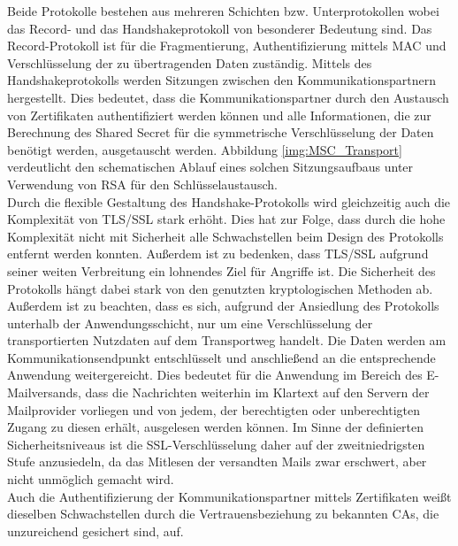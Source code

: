 \documentclass  [paper=a4,
				fontsize=12pt,
				listof=totoc,
				bibliography=totoc
				]{scrreprt}
\begin{document}
			Beide Protokolle bestehen aus mehreren Schichten bzw. Unterprotokollen wobei das Record- und das Handshakeprotokoll von besonderer Bedeutung sind. 
			Das Record-Protokoll ist für die Fragmentierung, Authentifizierung mittels \ac{MAC} und Verschlüsselung der zu übertragenden Daten zuständig. 
			Mittels des Handshakeprotokolls werden Sitzungen zwischen den Kommunikationspartnern hergestellt. 
			Dies bedeutet, dass die Kommunikationspartner durch den Austausch von Zertifikaten authentifiziert werden können und alle Informationen, die zur Berechnung des Shared Secret für die symmetrische Verschlüsselung der Daten benötigt werden, ausgetauscht werden. 
			Abbildung \ref{img:MSC_Transport} verdeutlicht den schematischen Ablauf eines solchen Sitzungsaufbaus unter Verwendung von \ac{RSA} für den Schlüsselaustausch.\\
			
			Durch die flexible Gestaltung des Handshake-Protokolls wird gleichzeitig auch die Komplexität von \ac{TLS/SSL} stark erhöht. 
			Dies hat zur Folge, dass durch die hohe Komplexität nicht mit Sicherheit alle Schwachstellen beim Design des Protokolls entfernt werden konnten. 
			Außerdem ist zu bedenken, dass \ac{TLS/SSL} aufgrund seiner weiten Verbreitung ein lohnendes Ziel für Angriffe ist. Die Sicherheit des Protokolls hängt dabei stark von den genutzten kryptologischen Methoden ab. 
			Außerdem ist zu beachten, dass es sich, aufgrund der Ansiedlung des Protokolls unterhalb der Anwendungsschicht, nur um eine Verschlüsselung der transportierten Nutzdaten auf dem Transportweg handelt. 
			Die Daten werden am Kommunikationsendpunkt entschlüsselt und anschließend an die entsprechende Anwendung weitergereicht.
			Dies bedeutet für die Anwendung im Bereich des E-Mailversands, dass die Nachrichten weiterhin im Klartext auf den Servern der Mailprovider vorliegen und von jedem, der berechtigten oder unberechtigten Zugang zu diesen erhält, ausgelesen werden können.
			Im Sinne der definierten Sicherheitsniveaus ist die \ac{SSL}-Verschlüsselung daher auf der zweitniedrigsten Stufe anzusiedeln, da das Mitlesen der versandten Mails zwar erschwert, aber nicht unmöglich gemacht wird.\\
			
			Auch die Authentifizierung der Kommunikationspartner mittels Zertifikaten weißt dieselben Schwachstellen durch die Vertrauensbeziehung zu bekannten \acp{CA}, die unzureichend gesichert sind, auf.  
\end{document}
